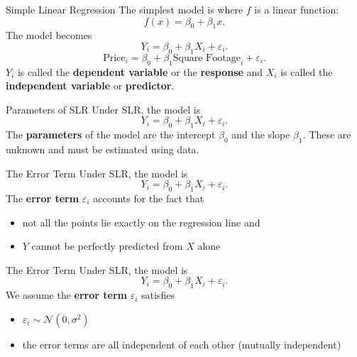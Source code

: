 \documentclass{beamer}
\begin{document}
\begin{frame}{Simple Linear Regression}
    The simplest model is where $f$ is a linear function:
    \begin{equation*}
        f(x) = \beta_0 + \beta_1 x.
    \end{equation*}
    The model becomes 
    \begin{equation*}
        Y_i = \beta_0 + \beta_1 X_i + \varepsilon_i.
    \end{equation*}
    \begin{equation*}
        \textrm{Price}_i = \beta_0 + \beta_1 \textrm{Square Footage}_i + \varepsilon_i.
    \end{equation*}
    $Y_i$ is called the \textbf{dependent variable} or the \textbf{response} and $X_i$ is called the \textbf{independent variable} or \textbf{predictor}.
\end{frame}

\begin{frame}{Parameters of SLR}
    Under SLR, the model is 
    \begin{equation*}
        Y_i = \beta_0 + \beta_1 X_i + \varepsilon_i.
    \end{equation*}
    The \textbf{parameters} of the model are the intercept $\beta_0$ and the slope $\beta_1$. These are unknown and must be estimated using data.
\end{frame}

\begin{frame}{The Error Term}
    Under SLR, the model is 
    \begin{equation*}
        Y_i = \beta_0 + \beta_1 X_i + \varepsilon_i.
    \end{equation*}
    The \textbf{error term} $\varepsilon_i$ accounts for the fact that 
    \begin{itemize}
        \item not all the points lie exactly on the regression line and
        \item $Y$ cannot be perfectly predicted from $X$ alone
    \end{itemize}
\end{frame}

\begin{frame}{The Error Term}
    Under SLR, the model is 
    \begin{equation*}
        Y_i = \beta_0 + \beta_1 X_i + \varepsilon_i.
    \end{equation*}
    We assume the \textbf{error term} $\varepsilon_i$ satisfies
    \begin{itemize}
        \item $\varepsilon_i \sim \mathcal{N}(0, \sigma^2)$
        \item the error terms are all independent of each other (mutually independent)
    \end{itemize}
\end{frame}
\end{document}
